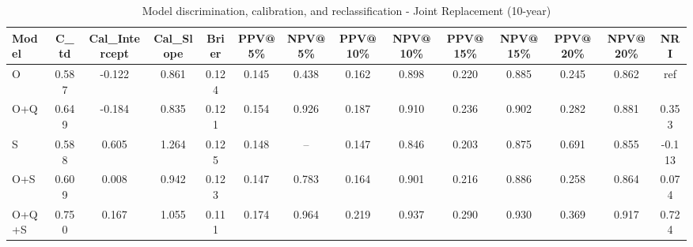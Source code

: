 \begin{table}[htbp]
\centering
\small
\caption{Model discrimination, calibration, and reclassification - Joint Replacement (10-year)}
\label{tab:perf_joint_10y}
\begin{tabular}{lccccccccccccc}
\toprule
Model & C\_td & Cal\_Intercept & Cal\_Slope & Brier & PPV@5\% & NPV@5\% & PPV@10\% & NPV@10\% & PPV@15\% & NPV@15\% & PPV@20\% & NPV@20\% & NRI \\
\midrule
O & 0.587 & -0.122 & 0.861 & 0.124 & 0.145 & 0.438 & 0.162 & 0.898 & 0.220 & 0.885 & 0.245 & 0.862 & ref \\
O+Q & 0.649 & -0.184 & 0.835 & 0.121 & 0.154 & 0.926 & 0.187 & 0.910 & 0.236 & 0.902 & 0.282 & 0.881 & 0.353 \\
S & 0.588 & 0.605 & 1.264 & 0.125 & 0.148 & -- & 0.147 & 0.846 & 0.203 & 0.875 & 0.691 & 0.855 & -0.113 \\
O+S & 0.609 & 0.008 & 0.942 & 0.123 & 0.147 & 0.783 & 0.164 & 0.901 & 0.216 & 0.886 & 0.258 & 0.864 & 0.074 \\
O+Q+S & 0.750 & 0.167 & 1.055 & 0.111 & 0.174 & 0.964 & 0.219 & 0.937 & 0.290 & 0.930 & 0.369 & 0.917 & 0.724 \\
\bottomrule
\end{tabular}
\end{table}